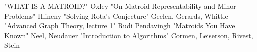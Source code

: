 
\begin{thebibliography}{10}

"WHAT IS A MATROID?" Oxley
"On Matroid Representability and Minor Problems" Hlineny
"Solving Rota’s Conjecture" Geelen, Gerards, Whittle
"Advanced Graph Theory, lecture 1" Rudi Pendavingh
"Matroids You Have Known" Neel, Neudauer
"Introduction to Algorithms" Cormen, Leiserson, Rivest, Stein

\end{thebibliography}

